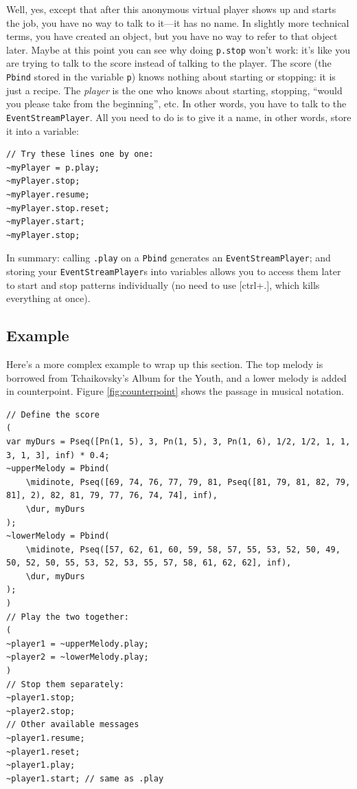 Well, yes, except that after this anonymous virtual player shows up and starts the job, you have no way to talk to it---it has no name. In slightly more technical terms, you have created an object, but you have no way to refer to that object later. Maybe at this point you can see why doing \texttt{p.stop} won't work: it's like you are trying to talk to the score instead of talking to the player. The score (the \texttt{Pbind} stored in the variable \texttt{p}) knows nothing about starting or stopping: it is just a recipe. The \emph{player} is the one who knows about starting, stopping, ``would you please take from the beginning'', etc. In other words, you have to talk to the \texttt{EventStreamPlayer}. All you need to do is to give it a name, in other words, store it into a variable:

 
\begin{lstlisting}[style=SuperCollider-IDE, basicstyle=\scttfamily\footnotesize]
// Try these lines one by one:
~myPlayer = p.play;
~myPlayer.stop;
~myPlayer.resume;
~myPlayer.stop.reset;
~myPlayer.start;
~myPlayer.stop;
\end{lstlisting}
 

In summary: calling \texttt{.play} on a \texttt{Pbind} generates an \texttt{EventStreamPlayer}; and storing your \texttt{EventStreamPlayer}s into variables allows you to access them later to start and stop patterns individually (no need to use [ctrl+.], which kills everything at once).

\subsection{Example}

Here's a more complex example to wrap up this section. The top melody is borrowed from Tchaikovsky's Album for the Youth, and a lower melody is added in counterpoint. Figure \ref{fig:counterpoint} shows the passage in musical notation.
 
%

\begin{lstlisting}[style=SuperCollider-IDE, basicstyle=\scttfamily\footnotesize]
// Define the score
(
var myDurs = Pseq([Pn(1, 5), 3, Pn(1, 5), 3, Pn(1, 6), 1/2, 1/2, 1, 1, 3, 1, 3], inf) * 0.4;
~upperMelody = Pbind(
	\midinote, Pseq([69, 74, 76, 77, 79, 81, Pseq([81, 79, 81, 82, 79, 81], 2), 82, 81, 79, 77, 76, 74, 74], inf),
	\dur, myDurs
);
~lowerMelody = Pbind(
	\midinote, Pseq([57, 62, 61, 60, 59, 58, 57, 55, 53, 52, 50, 49, 50, 52, 50, 55, 53, 52, 53, 55, 57, 58, 61, 62, 62], inf),
	\dur, myDurs
);
)
// Play the two together:
(
~player1 = ~upperMelody.play;
~player2 = ~lowerMelody.play;
)
// Stop them separately:
~player1.stop;
~player2.stop;
// Other available messages
~player1.resume;
~player1.reset;
~player1.play;
~player1.start; // same as .play
\end{lstlisting}

